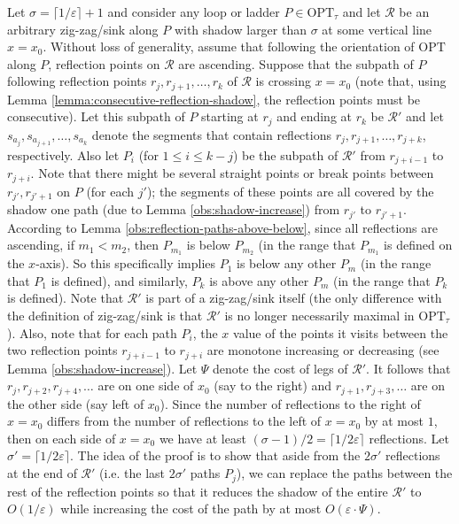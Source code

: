 \documentclass[10pt,a4paper]{amsart}
\theoremstyle{thmstyleone}
\newcommand{\eps}{\varepsilon}
\newcommand{\OPT}{{\text{OPT}}}
\begin{document}
Let $\sigma=\lceil 1/\eps\rceil + 1$  and
consider any loop or ladder $P\in \OPT_\tau$ and let $\mathcal R$ be an arbitrary zig-zag/sink along $P$ with shadow larger than $\sigma$ at some vertical line $x=x_0$. Without loss of generality, assume that following the orientation of $\OPT$ along $P$, reflection points on $\mathcal R$ are ascending. Suppose that the subpath of $P$ following reflection points $r_j,r_{j+1},\ldots,r_k$ of $\mathcal R$ is crossing $x=x_0$ (note that, using Lemma \ref{lemma:consecutive-reflection-shadow}, the reflection points must be consecutive).
Let this subpath of $P$ starting at $r_j$ and ending at $r_k$ be $\mathcal R'$
and let $s_{a_j}, s_{a_{j+1}},\dots, s_{a_k}$ denote the segments that contain reflections $r_{j}, r_{j + 1},\dots, r_{j + k}$, respectively.	Also let $P_i$ (for $1\leq i\leq k-j$) be the subpath of $\mathcal R'$ from $r_{j+i-1}$ to $r_{j+i}$. 
Note that there might be several straight points or break points between $r_{j'},r_{j'+1}$ on $P$ (for each $j'$); 
the segments of these points are all covered by the shadow one path (due to Lemma \ref{obs:shadow-increase}) from $r_{j'}$ to $r_{j'+1}$.
According to Lemma \ref{obs:reflection-paths-above-below}, since all reflections are ascending, if $m_1 < m_2$, then $P_{m_1}$ is below $P_{m_2}$ (in the range that $P_{m_1}$ is defined on the $x$-axis).
So this specifically implies $P_1$ is below any other $P_m$ (in the range that $P_1$ is defined), and similarly, $P_k$ is above any other $P_m$ (in the range that $P_k$ is defined).
Note that $\mathcal R'$ is part of a zig-zag/sink itself (the only difference with the definition of zig-zag/sink is that $\mathcal R'$ is no longer necessarily maximal in $ \OPT_\tau $). 
Also, note that for each path $P_i$, the $x$ value of the points it visits
between the two reflection points $r_{j+i-1}$ to $r_{j+i}$ are monotone
increasing or decreasing (see Lemma \ref{obs:shadow-increase}).
Let $\Psi$ denote the cost of legs of $\mathcal R'$.
It follows that $r_j,r_{j+2},r_{j+4},\ldots$ are on one side of $x_0$
(say to the right) and $r_{j+1},r_{j+3},\ldots$ are on the other side (say left of $x_0$). Since the number of reflections to the right of $x = x_0$ differs from the number of reflections to the left of $x = x_0$ by at most $1$, then on each side of $x = x_0$ we have at least $(\sigma-1)/2 = \lceil1/2\eps\rceil$ reflections. Let $\sigma'=\lceil 1/2\eps\rceil$.
The idea of the proof is to show that aside from the  $2\sigma'$ reflections at the end of $\mathcal R'$ (i.e. the last $2\sigma'$ paths $P_{j}$), we can replace the paths between the rest of the reflection points so that it reduces the shadow of the entire $\mathcal R'$ to $O(1/\eps)$ while increasing the cost of the path by at most $O(\eps\cdot\Psi)$. 
\end{document}
